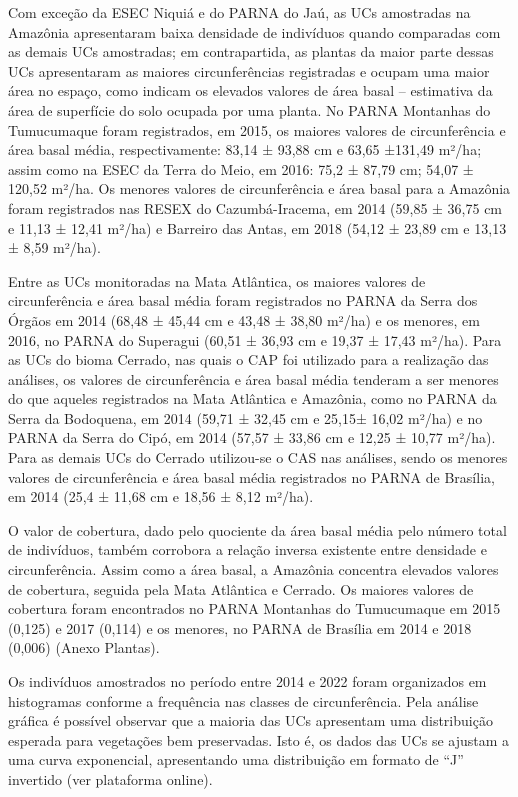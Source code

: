 \documentclass[
  letterpaper,
]{scrbook}
\begin{document}
Com exceção da ESEC Niquiá e do PARNA do Jaú, as UCs amostradas na
Amazônia apresentaram baixa densidade de indivíduos quando comparadas
com as demais UCs amostradas; em contrapartida, as plantas da maior
parte dessas UCs apresentaram as maiores circunferências registradas e
ocupam uma maior área no espaço, como indicam os elevados valores de
área basal -- estimativa da área de superfície do solo ocupada por uma
planta. No PARNA Montanhas do Tumucumaque foram registrados, em 2015, os
maiores valores de circunferência e área basal média, respectivamente:
83,14 ± 93,88 cm e 63,65 ±131,49 m²/ha; assim como na ESEC da Terra do
Meio, em 2016: 75,2 ± 87,79 cm; 54,07 ± 120,52 m²/ha. Os menores valores
de circunferência e área basal para a Amazônia foram registrados nas
RESEX do Cazumbá-Iracema, em 2014 (59,85 ± 36,75 cm e 11,13 ± 12,41
m²/ha) e Barreiro das Antas, em 2018 (54,12 ± 23,89 cm e 13,13 ± 8,59
m²/ha).

Entre as UCs monitoradas na Mata Atlântica, os maiores valores de
circunferência e área basal média foram registrados no PARNA da Serra
dos Órgãos em 2014 (68,48 ± 45,44 cm e 43,48 ± 38,80 m²/ha) e os
menores, em 2016, no PARNA do Superagui (60,51 ± 36,93 cm e 19,37 ±
17,43 m²/ha). Para as UCs do bioma Cerrado, nas quais o CAP foi
utilizado para a realização das análises, os valores de circunferência e
área basal média tenderam a ser menores do que aqueles registrados na
Mata Atlântica e Amazônia, como no PARNA da Serra da Bodoquena, em 2014
(59,71 ± 32,45 cm e 25,15± 16,02 m²/ha) e no PARNA da Serra do Cipó, em
2014 (57,57 ± 33,86 cm e 12,25 ± 10,77 m²/ha). Para as demais UCs do
Cerrado utilizou-se o CAS nas análises, sendo os menores valores de
circunferência e área basal média registrados no PARNA de Brasília, em
2014 (25,4 ± 11,68 cm e 18,56 ± 8,12 m²/ha).

O valor de cobertura, dado pelo quociente da área basal média pelo
número total de indivíduos, também corrobora a relação inversa existente
entre densidade e circunferência. Assim como a área basal, a Amazônia
concentra elevados valores de cobertura, seguida pela Mata Atlântica e
Cerrado. Os maiores valores de cobertura foram encontrados no PARNA
Montanhas do Tumucumaque em 2015 (0,125) e 2017 (0,114) e os menores, no
PARNA de Brasília em 2014 e 2018 (0,006) (Anexo Plantas).

Os indivíduos amostrados no período entre 2014 e 2022 foram organizados
em histogramas conforme a frequência nas classes de circunferência. Pela
análise gráfica é possível observar que a maioria das UCs apresentam uma
distribuição esperada para vegetações bem preservadas. Isto é, os dados
das UCs se ajustam a uma curva exponencial, apresentando uma
distribuição em formato de ``J'' invertido (ver plataforma online).
\end{document}
